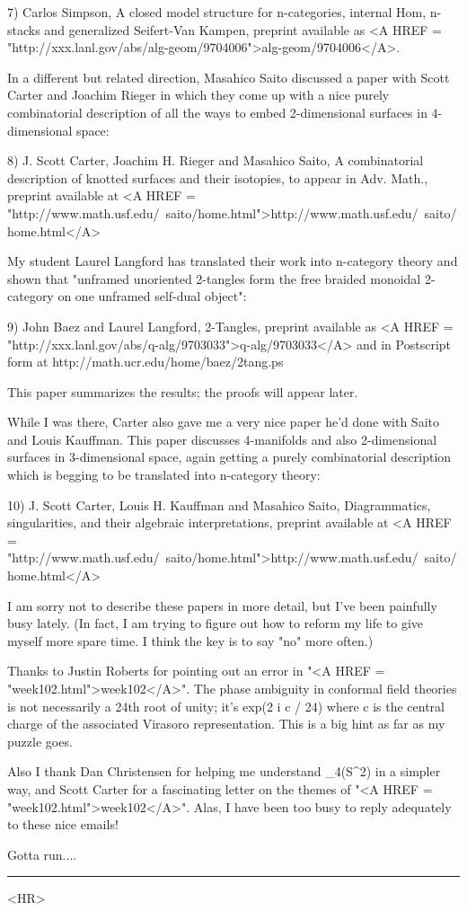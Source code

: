 7) Carlos Simpson, A closed model structure for n-categories, internal
Hom, n-stacks and generalized Seifert-Van Kampen, preprint available as
<A HREF = "http://xxx.lanl.gov/abs/alg-geom/9704006">alg-geom/9704006</A>.

In a different but related direction, Masahico Saito discussed
a paper with Scott Carter and Joachim Rieger in which they come
up with a nice purely combinatorial description of all the ways
to embed 2-dimensional surfaces in 4-dimensional space:

8) J. Scott Carter, Joachim H. Rieger and Masahico Saito,
A combinatorial description of knotted surfaces and their isotopies,
to appear in Adv. Math., preprint available at 
<A HREF = "http://www.math.usf.edu/~saito/home.html">http://www.math.usf.edu/~saito/home.html</A>
 
My student Laurel Langford has translated their work into 
n-category theory and shown that "unframed unoriented 2-tangles 
form the free braided monoidal 2-category on one unframed
self-dual object":

9) John Baez and Laurel Langford, 2-Tangles, preprint available
as <A HREF = "http://xxx.lanl.gov/abs/q-alg/9703033">q-alg/9703033</A> and in Postscript form at 
http://math.ucr.edu/home/baez/2tang.ps  

This paper summarizes the results; the proofs will appear later.

While I was there, Carter also gave me a very nice paper
he'd done with Saito and Louis Kauffman.  This paper discusses
4-manifolds and also 2-dimensional surfaces in 3-dimensional space,
again getting a purely combinatorial description which is begging
to be translated into n-category theory:

10) J. Scott Carter, Louis H. Kauffman and Masahico Saito, 
Diagrammatics, singularities, and their algebraic interpretations,
preprint available at <A HREF = "http://www.math.usf.edu/~saito/home.html">http://www.math.usf.edu/~saito/home.html</A>
 
I am sorry not to describe these papers in more detail, but
I've been painfully busy lately.  (In fact, I am trying
to figure out how to reform my life to give myself more spare
time.  I think the key is to say "no" more often.)

Thanks to Justin Roberts for pointing out an error in "<A HREF = "week102.html">week102</A>".  
The phase ambiguity in conformal field theories is not necessarily a
24th root of unity; it's exp(2 \pi  i c / 24) where c is the central
charge of the associated Virasoro representation.   This is a big
hint as far as my puzzle goes.  

Also I thank Dan Christensen for helping me understand \pi _4(S^2)
in a simpler way, and Scott Carter for a fascinating letter on 
the themes of "<A HREF = "week102.html">week102</A>".  Alas, I have been too busy to reply
adequately to these nice emails!

Gotta run....  



\par\noindent\rule{\textwidth}{0.4pt}
<HR>



